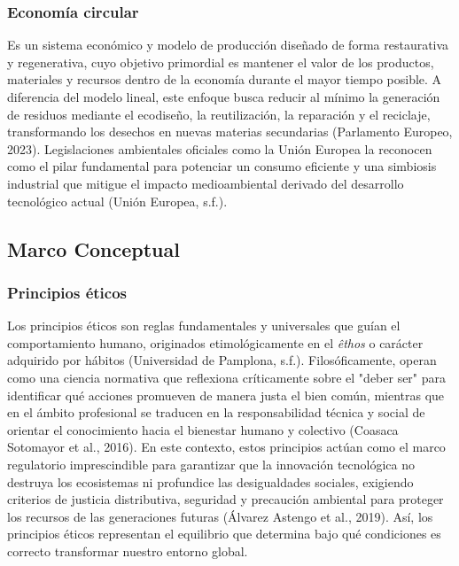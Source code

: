 \documentclass[stu,12pt,a4paper]{apa7}
\begin{document}
    \subsubsection{Economía circular}
Es un sistema económico y modelo de producción diseñado de forma restaurativa y regenerativa, cuyo objetivo primordial es mantener el valor de los productos, materiales y recursos dentro de la economía durante el mayor tiempo posible. A diferencia del modelo lineal, este enfoque busca reducir al mínimo la generación de residuos mediante el ecodiseño, la reutilización, la reparación y el reciclaje, transformando los desechos en nuevas materias secundarias (Parlamento Europeo, 2023). Legislaciones ambientales oficiales como la Unión Europea la reconocen como el pilar fundamental para potenciar un consumo eficiente y una simbiosis industrial que mitigue el impacto medioambiental derivado del desarrollo tecnológico actual (Unión Europea, s.f.).
    \subsection{Marco Conceptual}
    \subsubsection{Principios éticos}
Los principios éticos son reglas fundamentales y universales que guían el comportamiento humano, originados etimológicamente en el \textit{êthos} o carácter adquirido por hábitos (Universidad de Pamplona, s.f.). Filosóficamente, operan como una ciencia normativa que reflexiona críticamente sobre el "deber ser" para identificar qué acciones promueven de manera justa el bien común, mientras que en el ámbito profesional se traducen en la responsabilidad técnica y social de orientar el conocimiento hacia el bienestar humano y colectivo (Coasaca Sotomayor et al., 2016). En este contexto, estos principios actúan como el marco regulatorio imprescindible para garantizar que la innovación tecnológica no destruya los ecosistemas ni profundice las desigualdades sociales, exigiendo criterios de justicia distributiva, seguridad y precaución ambiental para proteger los recursos de las generaciones futuras (Álvarez Astengo et al., 2019). Así, los principios éticos representan el equilibrio que determina bajo qué condiciones es correcto transformar nuestro entorno global.
\end{document}
